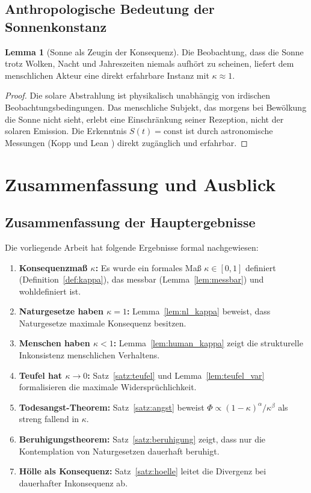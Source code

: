 ﻿\documentclass[a4paper,12pt]{article}
\theoremstyle{definition}
\newtheorem{lemma}{Lemma}
\begin{document}
\subsection{Anthropologische Bedeutung der Sonnenkonstanz}

\begin{lemma}[Sonne als Zeugin der Konsequenz]
\label{lem:sonne_zeuge}
Die Beobachtung, dass die Sonne trotz Wolken, Nacht und Jahreszeiten niemals aufhört zu scheinen, liefert dem menschlichen Akteur eine direkt erfahrbare Instanz mit $\kappa \approx 1$.
\end{lemma}

\begin{proof}
Die solare Abstrahlung ist physikalisch unabhängig von irdischen Beobachtungsbedingungen. Das menschliche Subjekt, das morgens bei Bewölkung die Sonne nicht sieht, erlebt eine Einschränkung seiner Rezeption, nicht der solaren Emission. Die Erkenntnis $S(t) = \text{const}$ ist durch astronomische Messungen (Kopp und Lean \cite{kopp2011}) direkt zugänglich und erfahrbar. \qedhere
\end{proof}

\section{Zusammenfassung und Ausblick}

\subsection{Zusammenfassung der Hauptergebnisse}

Die vorliegende Arbeit hat folgende Ergebnisse formal nachgewiesen:

\begin{enumerate}
\item \textbf{Konsequenzmaß $\kappa$:} Es wurde ein formales Maß $\kappa \in [0,1]$ definiert (Definition~\ref{def:kappa}), das messbar (Lemma~\ref{lem:messbar}) und wohldefiniert ist.
\item \textbf{Naturgesetze haben $\kappa = 1$:} Lemma~\ref{lem:nl_kappa} beweist, dass Naturgesetze maximale Konsequenz besitzen.
\item \textbf{Menschen haben $\kappa < 1$:} Lemma~\ref{lem:human_kappa} zeigt die strukturelle Inkonsistenz menschlichen Verhaltens.
\item \textbf{Teufel hat $\kappa \to 0$:} Satz~\ref{satz:teufel} und Lemma~\ref{lem:teufel_var} formalisieren die maximale Widersprüchlichkeit.
\item \textbf{Todesangst-Theorem:} Satz~\ref{satz:angst} beweist $\Phi \propto (1-\kappa)^\alpha / \kappa^\beta$ als streng fallend in $\kappa$.
\item \textbf{Beruhigungstheorem:} Satz~\ref{satz:beruhigung} zeigt, dass nur die Kontemplation von Naturgesetzen dauerhaft beruhigt.
\item \textbf{Hölle als Konsequenz:} Satz~\ref{satz:hoelle} leitet die Divergenz bei dauerhafter Inkonsequenz ab.
\end{enumerate}
\end{document}
